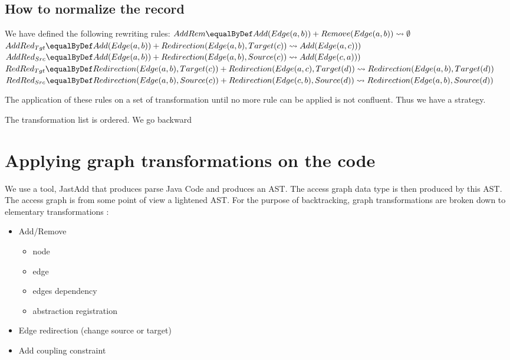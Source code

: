 \documentclass[]{article}
\begin{document}
\subsection{How to normalize the record}
We have defined the following rewriting rules:
$AddRem \equalByDef Add(Edge(a,b)) + Remove(Edge(a,b)) \leadsto \emptyset$\\
$AddRed_{Tgt} \equalByDef\\ Add(Edge(a,b)) + Redirection(Edge(a,b), Target(c)) \leadsto Add(Edge(a,c)))$\\
$AddRed_{Src} \equalByDef\\ Add(Edge(a,b)) + Redirection(Edge(a,b), Source(c)) \leadsto Add(Edge(c,a)))$\\
$RedRed_{Tgt} \equalByDef\\ Redirection(Edge(a,b), Target(c)) + Redirection(Edge(a,c), Target(d)) \\\leadsto Redirection(Edge(a,b), Target(d))$\\
$RedRed_{Src} \equalByDef\\ Redirection(Edge(a,b), Source(c)) + Redirection(Edge(c,b), Source(d)) \\\leadsto Redirection(Edge(a,b), Source(d))$

The application of these rules on a set of transformation until no more rule can be applied is not confluent. Thus we have a strategy.

The transformation list is ordered. 
We go backward 


\section{Applying graph transformations on the code}
We use a tool, JastAdd that produces parse Java Code and produces an AST. The access graph data type is then produced by this AST. The access graph is from some point of view a lightened AST.
For the purpose of backtracking, graph transformations are broken down to elementary transformations : 
\begin{itemize}
	\item Add/Remove
	\begin{itemize}
	\item node
	\item edge
	\item edges dependency 
	\item abstraction registration
	\end{itemize}
\item Edge redirection (change source or target)
\item Add coupling constraint	
\end{itemize}
\end{document}
